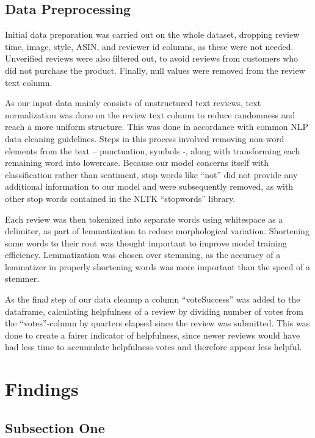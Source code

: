 \documentclass[twoside,twocolumn]{article}
\begin{document}
\subsection{Data Preprocessing}
Initial data preparation was carried out on the whole dataset, dropping review time, image, style, ASIN, and reviewer id columns, as these were not needed. Unverified reviews were also filtered out, to avoid reviews from customers who did not purchase the product. Finally, null values were removed from the review text column.

As our input data mainly consists of unstructured text reviews, text normalization was done on the review text column to reduce randomness and reach a more uniform structure. This was done in accordance with common NLP data cleaning guidelines. Steps in this process involved removing non-word elements from the text – punctuation, symbols -, along with transforming each remaining word into lowercase. Because our model concerns itself with classification rather than sentiment, stop words like “not” did not provide any additional information to our model and were subsequently removed, as with other stop words contained in the NLTK “stopwords” library.

Each review was then tokenized into separate words using whitespace as a delimiter, as part of lemmatization to reduce morphological variation. Shortening some words to their root was thought important to improve model training efficiency. Lemmatization was chosen over stemming, as the accuracy of a lemmatizer in properly shortening words was more important than the speed of a stemmer.

As the final step of our data cleanup a column “voteSuccess” was added to the dataframe, calculating helpfulness of a review by dividing number of votes from the “votes”-column by quarters elapsed since the review was submitted. This was done to create a fairer indicator of helpfulness, since newer reviews would have had less time to accumulate helpfulness-votes and therefore appear less helpful.

\section{Findings}

\subsection{Subsection One}
\end{document}
